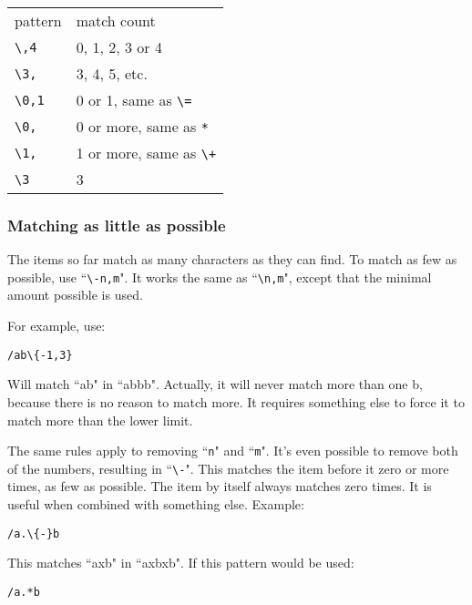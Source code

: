 \begin{center} \begin{tabular}{l l}
				pattern & match count \\
				\texttt{\textbackslash{}{,4}} & 0, 1, 2, 3 or 4 \\
				\texttt{\textbackslash{}{3,}} & 3, 4, 5, etc. \\
				\texttt{\textbackslash{}{0,1}} & 0 or 1, same as \texttt{\textbackslash{}=} \\
				\texttt{\textbackslash{}{0,}} & 0 or more, same as \texttt{*} \\
				\texttt{\textbackslash{}{1,}} & 1 or more, same as \texttt{\textbackslash{}+} \\
				\texttt{\textbackslash{}{3}} & 3 \\
\end{tabular} \end{center}
\subsubsection{Matching as little as possible}
The items so far match as many characters as they can find.
To match as few as possible, use ``\texttt{\textbackslash{}{-n,m}}".
It works the same as ``\texttt{\textbackslash{}{n,m}}", except that the minimal amount possible is used.

For example, use:

\begin{Verbatim}[samepage=true]
 /ab\{-1,3}
\end{Verbatim}

Will match ``ab" in ``abbb".
Actually, it will never match more than one b, because there is no reason to match more.
It requires something else to force it to match more than the lower limit.

The same rules apply to removing ``\texttt{n}" and ``\texttt{m}".
It's even possible to remove both of the numbers, resulting in ``\texttt{\textbackslash{}{-}}".
This matches the item before it zero or more times, as few as possible.
The item by itself always matches zero times.
It is useful when combined with something else.
Example:

\begin{Verbatim}[samepage=true]
 /a.\{-}b
\end{Verbatim}

This matches ``axb" in ``axbxb".
If this pattern would be used:

\begin{Verbatim}[samepage=true]
 /a.*b
\end{Verbatim}

